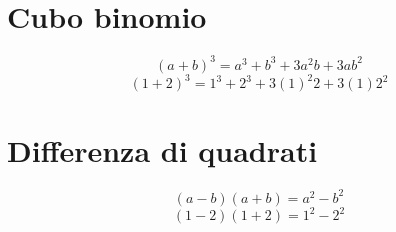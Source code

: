 \section{Cubo binomio}
\begin{equation}
(a+b)^3=a^3+b^3+3a^2b+3ab^2
\end{equation}
\begin{equation}
(1+2)^3=1^3+2^3+3(1)^2 2+3(1)2^2
\end{equation}
\section{Differenza di quadrati}
\begin{equation}
(a-b)(a+b)=a^2-b^2
\end{equation}
\begin{equation}
(1-2)(1+2)=1^2-2^2
\end{equation}
